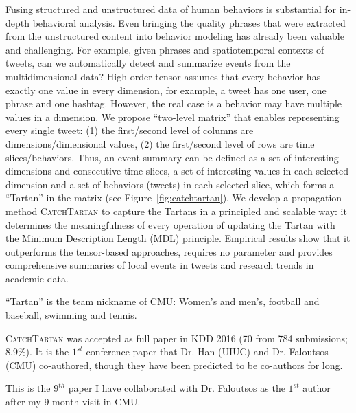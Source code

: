 \documentclass[10.5pt]{article}
\begin{document}
Fusing structured and unstructured data of human behaviors is substantial for in-depth behavioral analysis. Even bringing the quality phrases that were extracted from the unstructured content into behavior modeling has already been valuable and challenging. For example, given phrases and spatiotemporal contexts of tweets, can we automatically detect and summarize events from the multidimensional data? High-order tensor assumes that every behavior has exactly one value in every dimension, for example, a tweet has one user, one phrase and one hashtag. However, the real case is a behavior may have multiple values in a dimension. We propose ``two-level matrix'' that enables representing every single tweet: (1) the first/second level of columns are dimensions/dimensional values, (2) the first/second level of rows are time slices/behaviors. Thus, an event summary can be defined as a set of interesting dimensions and consecutive time slices, a set of interesting values in each selected dimension and a set of behaviors (tweets) in each selected slice, which forms a ``Tartan'' in the matrix (see Figure~\ref{fig:catchtartan}). We develop a propagation method \textsc{CatchTartan} \cite{jiang2016catchtartan} to capture the Tartans in a principled and scalable way: it determines the meaningfulness of every operation of updating the Tartan with the Minimum Description Length (MDL) principle. Empirical results show that it outperforms the tensor-based approaches, requires no parameter and provides comprehensive summaries of local events in tweets and research trends in academic data.

\begin{compactitem}
\item ``Tartan'' is the team nickname of CMU: Women's and men's, football and baseball, swimming and tennis.
\item \textsc{CatchTartan} \cite{jiang2016catchtartan} was accepted as full paper in KDD 2016 (70 from 784 submissions; 8.9\%). It is the $1^{st}$ conference paper that Dr. Han (UIUC) and Dr. Faloutsos (CMU) co-authored, though they have been predicted to be co-authors for long.
\item This is the \underline{$9^{th}$} paper I have collaborated with Dr. Faloutsos as the $1^{st}$ author after my \underline{$9$}-month visit in CMU.
\end{compactitem}

\vskip 0.10in
\vskip 0.01in
\end{document}
